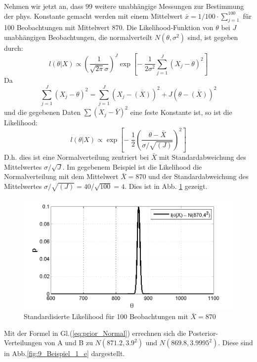 Nehmen wir jetzt an, dass 99 weitere unabhängige Messungen zur Bestimmung der 
phys. Konstante gemacht werden mit einem Mittelwert $\bar{x} = 1/100 \cdot \sum_{j=1}^{100}$ für 100 Beobachtungen mit Mittelwert 870. Die Likelihood-Funktion von $\theta$ bei $J$ unabhängigen Beobachtungen, die normalverteilt $N(\theta, \sigma^2)$ sind, ist gegeben durch:
\[
l(\theta|X) \propto \left( \frac{1}{\sqrt{2\pi}\sigma}\right)^J 
\exp \left[-\; \frac{1}{2\sigma^2}\sum_{j=1}^{J}(X_j-\theta)^2\right] 
\]
Da 
\[
\sum_{j=1}^{J} (X_j-\theta)^2 = \sum_{j=1}^{J} (X_j-\bar{(X)})^2+J(\theta-\bar{(X)})^2
\]
und die gegebenen Daten $\sum(X_j-\bar{Y})^2$ eine feste Konstante ist, so ist
die Likelihood:
\begin{equation}
l(\theta|X) \propto 
\exp \left[-\; \frac{1}{2} \left(\frac{\theta-\bar{X}}{\sigma / \sqrt{(J)}}
\right)^2\right]
\label{eq:Likelihood_Stichprobenumfang_J} 
\end{equation}
D.h. dies ist eine Normalverteilung zentriert bei $\bar{X}$ mit Standardabweichung des Mittelwertes
$\sigma / \sqrt{J}$.
Im gegebenem Beispiel ist die Likelihood die Normalverteilung mit dem Mittelwert
$\bar{X} = 870$ und der Standardabweichung des Mittelwertes $\sigma/\sqrt{(J)} = 40 / \sqrt{100} = 4$.
Dies ist in Abb. \ref{fig:Beispiel_1_d} gezeigt.

\begin{figure}[!h]
	\begin{center}
		\includegraphics[width=130mm]{08_vorlesung/media/likelihood_100_Beobachtung.png}
		\caption{Standardisierte Likelihood
		für 100 Beobachtungen mit $\bar{X} = 870$}
	    \label{fig:Beispiel_1_d}
	\end{center}
\end{figure}

Mit der Formel in Gl.(\ref{eq:prior_Normal}) errechnen sich die Posterior-Verteilungen 
von A und B zu $N(871.2,3.9^2)$ und $N(869.8,3.9995^2)$.
Diese sind in Abb.\ref{fig:9_Beispiel_1_e} dargestellt. 

